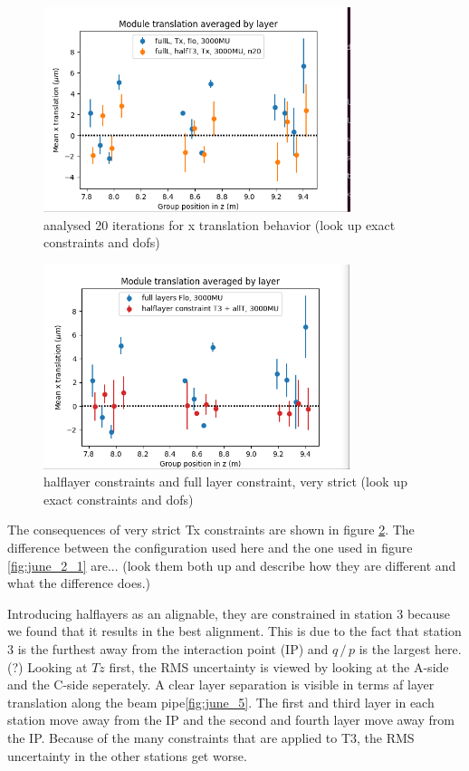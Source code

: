 \begin{figure}
  \centering
  \includegraphics[width=0.8\textwidth]{plots/june_21/allT_halfT3_n20_Tx.png}
  \caption{analysed 20 iterations for x translation behavior (look up exact constraints and dofs)}
  \label{fig:june_3}
\end{figure}

\begin{figure}
  \centering
  \includegraphics[width=0.8\textwidth]{plots/june_21/allT_halfT3_Tx_vs_Flo.png}
  \caption{halflayer constraints and full layer constraint, very strict (look up exact constraints and dofs)}
  \label{fig:june_4}
\end{figure}

The consequences of very strict Tx constraints are shown in figure \ref{fig:june_4}.
The difference between the configuration used here and the one used in figure
\ref{fig:june_2_1} are... (look them both up and describe how they are different
and what the difference does.)

Introducing halflayers as an alignable, they are constrained in station 3 because
we found that it results in the best alignment. This is due to the fact that station 3 is the furthest away from the interaction point (IP) and $q \,/\, p$ is the largest here. (?)
Looking at $Tz$ first, the RMS uncertainty is viewed by looking at the A-side and the C-side seperately.
A clear layer separation is visible in terms af layer translation along the beam pipe\ref{fig:june_5}.
The first and third layer in each station move away from the IP and the second and
fourth layer move away from the IP.
Because of the many constraints that are applied to T3, the RMS uncertainty in the other stations get worse.

